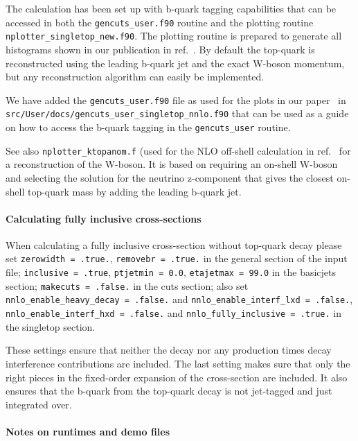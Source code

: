 The calculation has been set up with b-quark tagging capabilities that
can be accessed in both the \texttt{gencuts\_user.f90} routine and the
plotting routine \texttt{nplotter\_singletop\_new.f90}. The plotting
routine is prepared to generate all histograms shown in our publication
in ref.~\cite{Campbell:2020fhf}. By default the top-quark is
reconstructed using the leading b-quark jet and the exact W-boson
momentum, but any reconstruction algorithm can easily be implemented.

We have added the \texttt{gencuts\_user.f90} file as used for the plots
in our paper~\cite{Campbell:2020fhf} in \\
\texttt{src/User/docs/gencuts\_user\_singletop\_nnlo.f90} that can be
used as a guide on how to access the b-quark tagging in the
\texttt{gencuts\_user} routine.

See also \texttt{nplotter\_ktopanom.f} (used for the NLO off-shell
calculation in ref.~\cite{Neumann:2019kvk} for a reconstruction of the
W-boson. It is based on requiring an on-shell W-boson and selecting the
solution for the neutrino z-component that gives the closest on-shell
top-quark mass by adding the leading b-quark jet.

\paragraph{Calculating fully inclusive
cross-sections}\label{calculating-fully-inclusive-cross-sections}

When calculating a fully inclusive cross-section without top-quark decay
please set \texttt{zerowidth\ =\ .true.},
\texttt{removebr\ =\ .true.} in the general section of the input file;
\texttt{inclusive\ =\ .true}, \texttt{ptjetmin\ =\ 0.0},
\texttt{etajetmax\ =\ 99.0} in the basicjets section;
\texttt{makecuts\ =\ .false.} in the cuts section; also set
\texttt{nnlo\_enable\_heavy\_decay\ =\ .false.} and
\texttt{nnlo\_enable\_interf\_lxd\ =\ .false.},
\texttt{nnlo\_enable\_interf\_hxd\ =\ .false.} and
\texttt{nnlo\_fully\_inclusive\ =\ .true.} in the singletop section.

These settings ensure that neither the decay nor any production times
decay interference contributions are included. The last setting makes
sure that only the right pieces in the fixed-order expansion of the
cross-section are included. It also ensures that the b-quark from the
top-quark decay is not jet-tagged and just integrated over.

\paragraph{Notes on runtimes and demo files}\label{notes-on-runtimes-and-demo-files}

